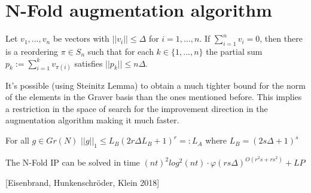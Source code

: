 \newpage
\section{N-Fold augmentation algorithm}

\begin{lemma}
    Let $v_1,...,v_n$ be vectors with $||v_i|| \leq \Delta$ for $i = 1,...,n$. If $\sum_{i=1}^{n} v_i = 0$, then there is a reordering $\pi \in S_n$ such that for each $k \in \{1,...,n\}$ the partial sum $p_k := \sum_{i=1}^{k}v_{\pi(i)}$ satisfies $||p_k|| \leq n\Delta$.
\end{lemma}

It's possible (using Steinitz Lemma) to obtain a much tighter bound for the norm of the elements in the Graver basis than the ones mentioned before. This implies a restriction in the space of search for the improvement direction in the augmentation algorithm making it much faster.

\begin{lemma}
    For all $g \in Gr(N)$ $||g||_1 \leq L_B (2r\Delta L_B + 1)^r =: L_A$ where $L_B = (2s \Delta + 1)^s$
\end{lemma}

\begin{lemma}
    The N-Fold IP can be solved in time $(nt)^2 log^2(nt) \cdot \varphi (rs\Delta)^{O(r^2s + rs^2)} + LP$
\end{lemma}
\hspace{15pt} [Eisenbrand, Hunkenschröder, Klein 2018]
        